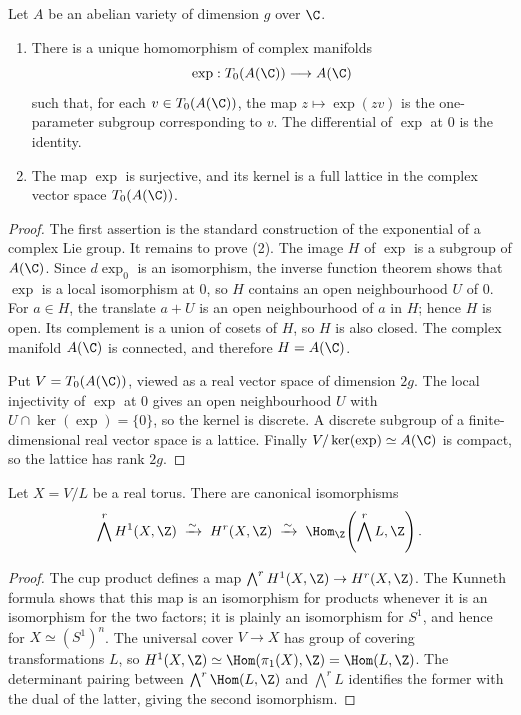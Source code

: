 \begin{proposition}
\label{prop:milne-complex-exponential}

Let $A$ be an abelian variety of dimension $g$ over $\C$.
\begin{enumerate}
\item There is a unique homomorphism of complex manifolds
\[
 \exp:T_0(A(\C))\longrightarrow A(\C)
\]
such that, for each $v\in T_0(A(\C))$, the map
$z\mapsto\exp(zv)$ is the one-parameter subgroup corresponding to $v$.
The differential of $\exp$ at $0$ is the identity.
\item The map $\exp$ is surjective, and its kernel is a full lattice in the
complex vector space $T_0(A(\C))$.
\end{enumerate}
\end{proposition}

\begin{proof}
The first assertion is the standard construction of the exponential of a
complex Lie group.  It remains to prove (2).  The image $H$ of $\exp$ is a
subgroup of $A(\C)$.  Since $d\exp_0$ is an isomorphism, the inverse function
theorem shows that $\exp$ is a local isomorphism at $0$, so $H$ contains an
open neighbourhood $U$ of $0$.  For $a\in H$, the translate $a+U$ is an open
neighbourhood of $a$ in $H$; hence $H$ is open.  Its complement is a union of
cosets of $H$, so $H$ is also closed.  The complex manifold $A(\C)$ is
connected, and therefore $H=A(\C)$.

Put $V=T_0(A(\C))$, viewed as a real vector space of dimension $2g$.  The
local injectivity of $\exp$ at $0$ gives an open neighbourhood $U$ with
$U\cap\ker(\exp)=\{0\}$, so the kernel is discrete.  A discrete subgroup of a
finite-dimensional real vector space is a lattice.  Finally
$V/\ker(\exp)\simeq A(\C)$ is compact, so the lattice has rank $2g$.
\end{proof}

\begin{theorem}
\label{thm:milne-torus-cohomology}

Let $X=V/L$ be a real torus.  There are canonical isomorphisms
\[
 \bigwedge^r H^1(X,\Z)\;\xrightarrow{\sim}\;H^r(X,\Z)
 \;\xrightarrow{\sim}\;\Hom_\Z\!\left(\bigwedge^r L,\Z\right).
\]
\end{theorem}

\begin{proof}
The cup product defines a map
$\bigwedge^rH^1(X,\Z)\to H^r(X,\Z)$.  The Kunneth formula shows that this
map is an isomorphism for products whenever it is an isomorphism for the two
factors; it is plainly an isomorphism for $S^1$, and hence for
$X\simeq(S^1)^n$.  The universal cover $V\to X$ has group of covering
transformations $L$, so
$H^1(X,\Z)\simeq\Hom(\pi_1(X),\Z)=\Hom(L,\Z)$.  The determinant pairing
between $\bigwedge^r\Hom(L,\Z)$ and $\bigwedge^rL$ identifies the former
with the dual of the latter, giving the second isomorphism.
\end{proof}

